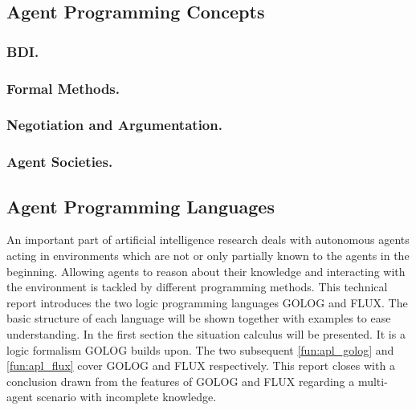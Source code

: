 \subsection{Agent Programming Concepts}
\subsubsection{BDI.}
\subsubsection{Formal Methods.}


\subsubsection{Negotiation and Argumentation.}


\subsubsection{Agent Societies.}
\subsection{Agent Programming Languages}
An important part of artificial intelligence research deals with autonomous agents acting in environments which are not or only partially known to the agents in the beginning. Allowing agents to reason about their knowledge and interacting with the environment is tackled by different programming methods. This technical report introduces the two logic programming languages GOLOG and FLUX. The basic structure of each language will be shown together with examples to ease understanding. In the first section the situation calculus will be presented. It is a logic formalism GOLOG builds upon. The two subsequent \autoref{fun:apl_golog} and \autoref{fun:apl_flux} cover GOLOG and FLUX respectively. This report closes with a conclusion drawn from the features of GOLOG and FLUX regarding a multi-agent scenario with incomplete knowledge.








